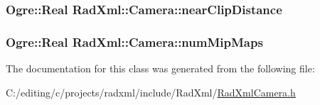 \hypertarget{class_rad_xml_1_1_camera_abc9d35602d1b6b2325d527fa0d0e35cd}{
\subsubsection[{near\-Clip\-Distance}]{\setlength{\rightskip}{0pt plus 5cm}Ogre\-::\-Real Rad\-Xml\-::\-Camera\-::near\-Clip\-Distance}}\label{class_rad_xml_1_1_camera_abc9d35602d1b6b2325d527fa0d0e35cd}
\hypertarget{class_rad_xml_1_1_camera_a97c0af25c9ba6e1e7af7235e1e4ec994}{
\subsubsection[{num\-Mip\-Maps}]{\setlength{\rightskip}{0pt plus 5cm}Ogre\-::\-Real Rad\-Xml\-::\-Camera\-::num\-Mip\-Maps}}\label{class_rad_xml_1_1_camera_a97c0af25c9ba6e1e7af7235e1e4ec994}


The documentation for this class was generated from the following file\-:\begin{DoxyCompactItemize}
\item 
C\-:/editing/c/projects/radxml/include/\-Rad\-Xml/\hyperlink{_rad_xml_camera_8h}{Rad\-Xml\-Camera.\-h}\end{DoxyCompactItemize}

